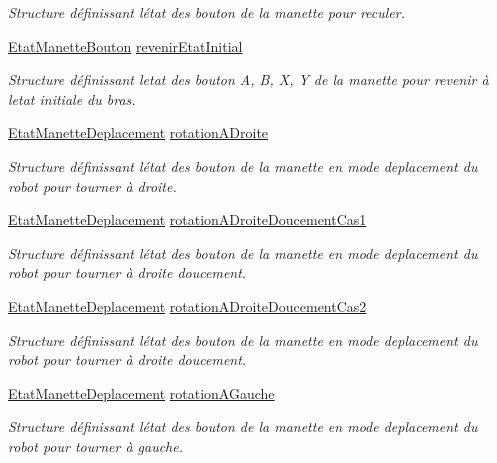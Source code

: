 \begin{DoxyCompactItemize}
\begin{DoxyCompactList}\small\item\em Structure définissant l\textquotesingle{}état des bouton de la manette pour reculer. \end{DoxyCompactList}\item 
\hyperlink{struct_etat_manette_bouton}{Etat\+Manette\+Bouton} \hyperlink{class_manette_a4c0e9611f08e363feb0a24f8c9d258f2}{revenir\+Etat\+Initial}
\begin{DoxyCompactList}\small\item\em Structure définissant l\textquotesingle{}etat des bouton A, B, X, Y de la manette pour revenir à l\textquotesingle{}etat initiale du bras. \end{DoxyCompactList}\item 
\hyperlink{struct_etat_manette_deplacement}{Etat\+Manette\+Deplacement} \hyperlink{class_manette_abeff301c65d7faeb68e7d38b8f0b5122}{rotation\+A\+Droite}
\begin{DoxyCompactList}\small\item\em Structure définissant l\textquotesingle{}état des bouton de la manette en mode deplacement du robot pour tourner à droite. \end{DoxyCompactList}\item 
\hyperlink{struct_etat_manette_deplacement}{Etat\+Manette\+Deplacement} \hyperlink{class_manette_ac7bf8fa21acad7d4afe9e73c62c224a9}{rotation\+A\+Droite\+Doucement\+Cas1}
\begin{DoxyCompactList}\small\item\em Structure définissant l\textquotesingle{}état des bouton de la manette en mode deplacement du robot pour tourner à droite doucement. \end{DoxyCompactList}\item 
\hyperlink{struct_etat_manette_deplacement}{Etat\+Manette\+Deplacement} \hyperlink{class_manette_a1ae7c87ab4c27fec817e7b02de9e546b}{rotation\+A\+Droite\+Doucement\+Cas2}
\begin{DoxyCompactList}\small\item\em Structure définissant l\textquotesingle{}état des bouton de la manette en mode deplacement du robot pour tourner à droite doucement. \end{DoxyCompactList}\item 
\hyperlink{struct_etat_manette_deplacement}{Etat\+Manette\+Deplacement} \hyperlink{class_manette_a3aa7b857df1a364d70f1626f2f517056}{rotation\+A\+Gauche}
\begin{DoxyCompactList}\small\item\em Structure définissant l\textquotesingle{}état des bouton de la manette en mode deplacement du robot pour tourner à gauche. \end{DoxyCompactList}\item 

\end{DoxyCompactItemize}
